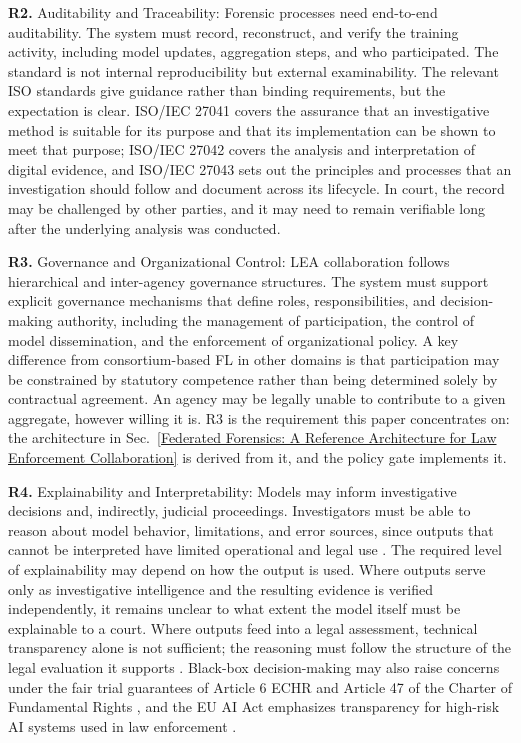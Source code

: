 \textbf{R2.} Auditability and Traceability:
Forensic processes need end-to-end auditability. The system must record, reconstruct, and verify the training activity, including model updates, aggregation steps, and who participated. 
The standard is not internal reproducibility but external examinability. The relevant ISO standards give guidance rather than binding requirements, but the expectation is clear. ISO/IEC 27041 covers the assurance that an investigative method is suitable for its purpose and that its implementation can be shown to meet that purpose; ISO/IEC 27042 covers the analysis and interpretation of digital evidence, and ISO/IEC 27043 sets out the principles and processes that an investigation should follow and document across its lifecycle. In court, the record may be challenged by other parties, and it may need to remain verifiable long after the underlying analysis was conducted.


\textbf{R3.} Governance and Organizational Control:
LEA collaboration follows hierarchical and inter-agency governance structures. The system must support explicit governance mechanisms that define roles, responsibilities, and decision-making authority, including the management of participation, the control of model dissemination, and the enforcement of organizational policy. A key difference from consortium-based FL in other domains is that participation may be constrained by statutory competence rather than being determined solely by contractual agreement. An agency may be legally unable to contribute to a given aggregate, however willing it is. R3 is the requirement this paper concentrates on: the architecture in Sec.~\ref{Federated Forensics: A Reference Architecture for Law Enforcement Collaboration} is derived from it, and the policy gate implements it.

\textbf{R4.} Explainability and Interpretability:
Models may inform investigative decisions and, indirectly, judicial proceedings. Investigators must be able to reason about model behavior, limitations, and error sources, since outputs that cannot be interpreted have limited operational and legal use \citep{solanke2022explainable,michelet2026gptoss}. The required level of explainability may depend on how the output is used. Where outputs serve only as investigative intelligence and the resulting evidence is verified independently, it remains unclear to what extent the model itself must be explainable to a court. Where outputs feed into a legal assessment, technical transparency alone is not sufficient; the reasoning must follow the structure of the legal evaluation it supports \citep{herrmann2026siak,herrmann2026embedding}. Black-box decision-making may also raise concerns under the fair trial guarantees of Article 6 ECHR and Article 47 of the Charter of Fundamental Rights \citep{echr_art6,cfreu_art47}, and the EU AI Act emphasizes transparency for high-risk AI systems used in law enforcement \citep{euaiact2024}.

